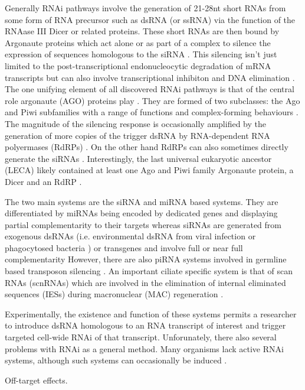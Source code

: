 Generally RNAi pathways involve the generation of 21-28nt short RNAs
from some form of RNA precursor such as dsRNA (or ssRNA)
via the function of the RNAase III Dicer \citep{Bernstein2001} or related proteins.
These short RNAs are then bound by Argonaute proteins which act alone or as part
of a complex to silence the expression of sequences homologous to the siRNA \citep{Ketting2011}.
This silencing isn't just limited to the post-transcriptional endonucleocytic degradation of 
mRNA transcripts but can also involve transcriptional inhibiton and
DNA elimination \citep{Marker2014}.
The one unifying element of all discovered RNAi pathways is that
of the central role argonaute (AGO) proteins play \citep{Ketting2011}.
They are formed of two subclasses: the Ago and Piwi subfamilies \citep{Peters2007}
with a range of functions and complex-forming behaviours
\citep{Ender2010}.
The magnitude of the silencing response is occasionally amplified by the generation
of more copies of the trigger dsRNA by RNA-dependent RNA polyermases (RdRPs) \citep{Arp2007}.
On the other hand RdRPs can also sometimes directly generate the siRNAs \citep{Aoki2007,Ketting2011}.
Interestingly, the last universal eukaryotic ancestor (LECA) likely contained 
at least one Ago and Piwi family Argonaute protein, a Dicer and an RdRP \citep{Cerutti2006}.

The two main systems are the siRNA and miRNA based systems.  They are differentiated
by miRNAs being encoded by dedicated genes and displaying partial
complementarity to their targets whereas siRNAs are generated from exogenous
dsRNAs (i.e. environmental dsRNA from viral infection or phagocytosed bacteria \citep{Whangbo2008})
or transgenes and involve full or near full complementarity \citep{Shabalina2008}
However, there are also piRNA systems involved in germline based transposon silencing \citep{Iwasaki2015}.
An important ciliate specific system is that of scan RNAs (scnRNAs) which 
are involved in the elimination of internal eliminated sequences (IESs) during
macronuclear (MAC) regeneration \citep{Mochizuki2004,Chalker2013}.


Experimentally, the existence and function of these systems
permits a researcher to introduce dsRNA homologous to an RNA transcript of interest
and trigger targeted cell-wide RNAi of that transcript.
Unforunately, there also several problems with RNAi as a general method.
Many organisms lack active RNAi systems, although such systems can occasionally
be induced \citep{Alibu2005}.

Off-target effects.


